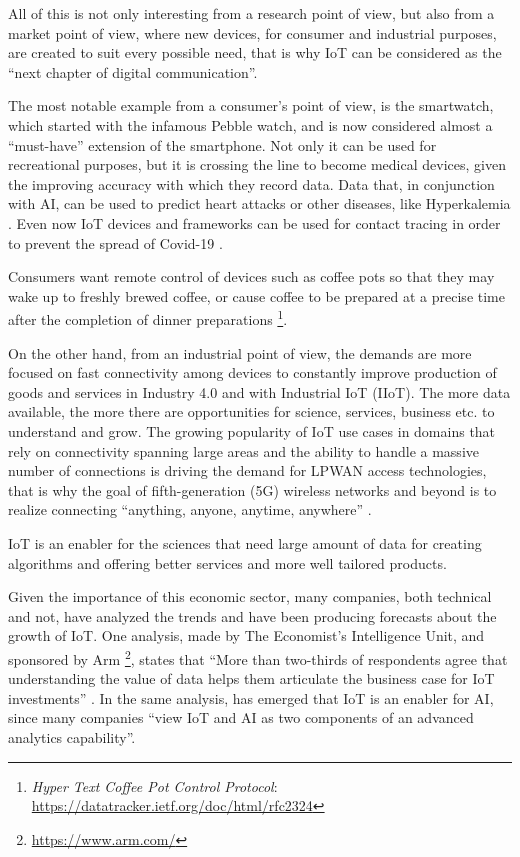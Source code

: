 			All of this is not only interesting from a research point of view, but also from a market point of view, where new devices, for consumer and industrial purposes, are created to suit every possible need, that is why IoT can be considered as the ``next chapter of digital communication''.
			
			The most notable example from a consumer's point of view, is the smartwatch, which started with the infamous Pebble watch, and is now considered almost a ``must-have'' extension of the smartphone.
			Not only it can be used for recreational purposes, but it is crossing the line to become medical devices, given the improving accuracy with which they record data.
			Data that, in conjunction with AI, can be used to predict heart attacks \cite{7946780} or other diseases, like Hyperkalemia \cite{HYPERKALEMIA}.
			Even now IoT devices and frameworks can be used for contact tracing in order to prevent the spread of Covid-19 \cite{9181512}.
			
			Consumers want remote control of devices such as coffee pots so that they may wake up to freshly	brewed coffee, or cause coffee to be prepared at a precise time after the completion of dinner preparations \footnote{\textit{Hyper Text Coffee Pot Control Protocol}: \url{https://datatracker.ietf.org/doc/html/rfc2324}}.
			
			On the other hand, from an industrial point of view, the demands are more focused on fast connectivity among devices to constantly improve production of goods and services in Industry 4.0 and with Industrial IoT (IIoT).
			The more data available, the more there are opportunities for science, services, business etc. to understand and grow.
			The growing popularity of IoT use cases in domains that rely on connectivity spanning large areas and the ability to handle a massive number of connections is driving the demand for LPWAN access technologies, that is why the goal of fifth-generation (5G) wireless networks and beyond is to realize connecting “anything, anyone, anytime, anywhere” \cite{7414384}.

			IoT is an enabler for the sciences that need large amount of data for creating algorithms and offering better services and more well tailored products.
			
			Given the importance of this economic sector, many companies, both technical and not, have analyzed the trends and have been producing forecasts about the growth of IoT.
			One analysis, made by The Economist's Intelligence Unit, and sponsored by Arm \footnote{\url{https://www.arm.com/}}, states that ``More than two-thirds of respondents agree that understanding the value of data helps them articulate the business case for IoT investments'' \cite{economist-iot-business-index-2020-arm}.
			In the same analysis, has emerged that IoT is an enabler for AI, since many companies ``view IoT and AI as two components of an advanced analytics capability''.
	
